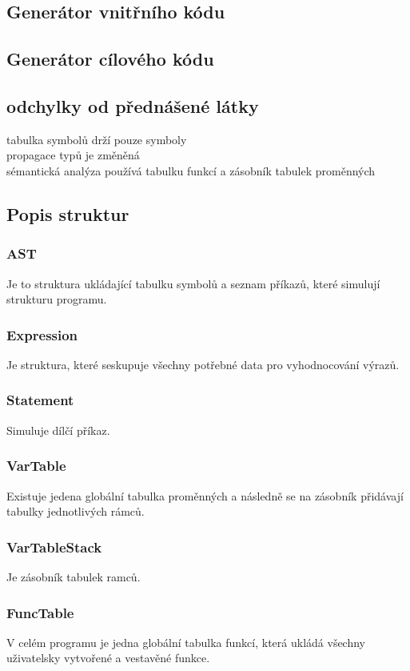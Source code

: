 \documentclass[12pt]{article}
\begin{document}
\subsection{Generátor vnitřního kódu}


\subsection{Generátor cílového kódu}


 \subsection{odchylky od přednášené látky}
    tabulka symbolů drží pouze symboly\\
    propagace typů je změněná \\
    sémantická analýza používá tabulku funkcí a zásobník tabulek proměnných\\    

\subsection{Popis struktur}
\subsubsection{AST}
Je to struktura ukládající tabulku symbolů a seznam příkazů, které simulují strukturu programu.
\subsubsection{Expression}
Je struktura, které seskupuje všechny potřebné data pro vyhodnocování výrazů.
\subsubsection{Statement}
Simuluje dílčí příkaz.
\subsubsection{VarTable}
Existuje jedena globální tabulka proměnných a následně se na zásobník přidávají tabulky jednotlivých rámců.
\subsubsection{VarTableStack}
Je zásobník tabulek ramců.
\subsubsection{FuncTable}
V celém programu je jedna globální tabulka funkcí, která ukládá všechny uživatelsky vytvořené a vestavěné funkce.
    
\end{document}
